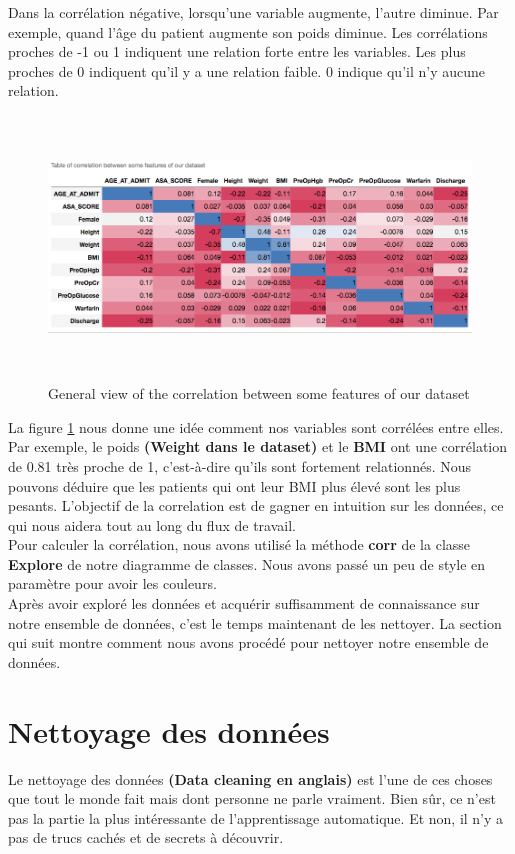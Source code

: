 \documentclass[12pt, french]{report}
\begin{document}
Dans la corrélation négative, lorsqu'une variable augmente, l'autre diminue. Par exemple, quand l'âge du patient augmente son poids diminue. Les corrélations proches de -1 ou 1 indiquent une relation forte entre les variables. Les plus proches de 0 indiquent qu'il y a une relation faible. 0 indique qu'il n'y aucune relation.

\begin{figure}[h]
\includegraphics[width=17.5cm, height =7cm]{images/correlation.png}
\caption{General view of the correlation between some features of our dataset}
\label{fig:correlation}
\end{figure}

La figure \ref{fig:correlation} nous donne une idée comment nos variables sont corrélées entre elles. Par exemple, le poids \textbf{ (Weight dans le dataset)} et le \textbf{BMI} ont une corrélation de 0.81 très proche de 1, c'est-à-dire qu'ils sont fortement relationnés. Nous pouvons déduire que les patients qui ont leur BMI plus élevé sont les plus pesants. L'objectif de la correlation est de gagner en intuition sur les données, ce qui nous aidera tout au long du flux de travail.\\ 

Pour calculer la corrélation, nous avons utilisé la méthode \textbf{corr} de  la classe \textbf{Explore} de notre diagramme de classes. Nous avons passé un peu de style en paramètre pour avoir les couleurs.  \\
 
Après avoir exploré les données et acquérir suffisamment de connaissance sur notre ensemble de données, c'est le temps maintenant de les nettoyer. La section qui suit montre comment nous avons procédé pour nettoyer notre ensemble de données.

\section{Nettoyage des données}
Le nettoyage des données \textbf{(Data cleaning en anglais)} est l'une de ces choses que tout le monde fait mais dont personne ne parle vraiment. Bien sûr, ce n'est pas la partie la plus intéressante de l'apprentissage automatique. Et non, il n'y a pas de trucs cachés et de secrets à découvrir.
\end{document}
